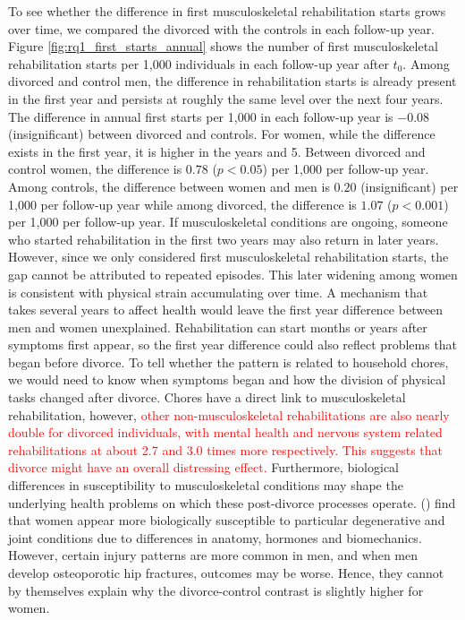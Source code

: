 \documentclass[a4paper,12pt]{article}
\theoremstyle{plain}
\theoremstyle{definition}
\theoremstyle{TheoremNum}
\theoremstyle{CorollaryNum}
\theoremstyle{PropositionNum}
\theoremstyle{TheoremNum}
\begin{document}
To see whether the difference in first musculoskeletal rehabilitation starts grows over time, we compared the divorced with the controls in each follow-up year. Figure \ref{fig:rq1_first_starts_annual} shows the number of first musculoskeletal rehabilitation starts per 1,000 individuals in each follow-up year after $t_0$. Among divorced and control men, the difference in rehabilitation starts is already present in the first year and persists at roughly the same level over the next four years. The difference in annual first starts per 1,000 in each follow-up year is $-0.08$ (insignificant) between divorced and controls. For women, while the difference exists in the first year, it is higher in the years and 5. Between divorced and control women, the difference is $0.78$ ($p < 0.05$) per 1,000 per follow-up year. Among controls, the difference between women and men is $0.20$ (insignificant) per 1,000 per follow-up year while among divorced, the difference is $1.07$ ($p < 0.001$) per 1,000 per follow-up year. If musculoskeletal conditions are ongoing, someone who started rehabilitation in the first two years may also return in later years. However, since we only considered first musculoskeletal rehabilitation starts, the gap cannot be attributed to repeated episodes. This later widening among women is consistent with physical strain accumulating over time. A mechanism that takes several years to affect health would leave the first year difference between men and women unexplained. Rehabilitation can start months or years after symptoms first appear, so the first year difference could also reflect problems that began before divorce. To tell whether the pattern is related to household chores, we would need to know when symptoms began and how the division of physical tasks changed after divorce. Chores have a direct link to musculoskeletal rehabilitation, however, \textcolor{red}{other non-musculoskeletal rehabilitations are also nearly double for divorced individuals, with mental health and nervous system related rehabilitations at about 2.7 and 3.0 times more respectively. This suggests that divorce might have an overall distressing effect.} Furthermore, biological differences in susceptibility to musculoskeletal conditions may shape the underlying health problems on which these post-divorce processes operate. \citeauthor{wolf2015male} (\citeyear{wolf2015male}) find that women appear more biologically susceptible to particular degenerative and joint conditions due to differences in anatomy, hormones and biomechanics. However, certain injury patterns are more common in men, and when men develop osteoporotic hip fractures, outcomes may be worse. Hence, they cannot by themselves explain why the divorce-control contrast is slightly higher for women. 
\end{document}
